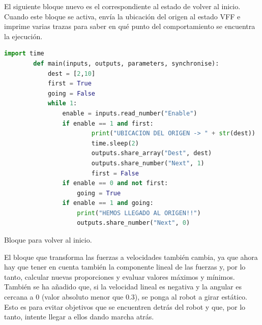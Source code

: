 El siguiente bloque nuevo es el correspondiente al estado de volver al inicio. Cuando este bloque se activa, envía la ubicación del origen al estado VFF e imprime
varias trazas para saber en qué punto del comportamiento se encuentra la ejecución.

\begin{code}[H]
    \begin{lstlisting}[language=python]
        import time
        def main(inputs, outputs, parameters, synchronise):
            dest = [2,10]
            first = True
            going = False
            while 1:
                enable = inputs.read_number("Enable")
                if enable == 1 and first:
                        print("UBICACION DEL ORIGEN -> " + str(dest))
                        time.sleep(2)
                        outputs.share_array("Dest", dest)
                        outputs.share_number("Next", 1)
                        first = False
                if enable == 0 and not first:
                    going = True
                if enable == 1 and going:
                    print("HEMOS LLEGADO AL ORIGEN!!")
                    outputs.share_number("Next", 0)
    \end{lstlisting}
    \caption[Bloque return home]{Bloque para volver al inicio.}
    \label{cod:FSM_return_home}
\end{code}

El bloque que transforma las fuerzas a velocidades también cambia, ya que ahora hay que tener en cuenta también la componente lineal de las fuerzas y, por lo tanto, calcular nuevas
proporciones y evaluar valores máximos y mínimos. También se ha añadido que, si la velocidad lineal es negativa y la angular es cercana a 0 (valor absoluto menor que 0.3), se
ponga al robot a girar estático. Esto es para evitar objetivos que se encuentren detrás del robot y que, por lo tanto, intente llegar a ellos dando marcha atrás.

